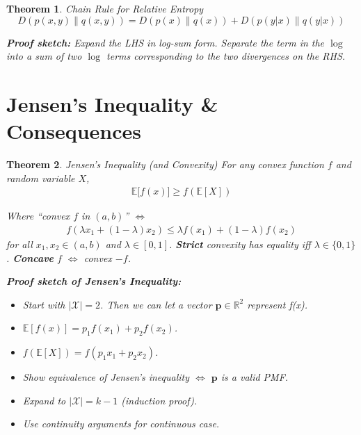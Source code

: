 \documentclass[a4paper,12pt]{report}
\newtheorem{theorem}{Theorem}
\begin{document}
\begin{theorem}{Chain Rule for Relative Entropy}
\begin{equation}
D(p(x,y) \| q(x,y)) = D(p(x) \| q(x)) + D(p(y | x) \| q(y|x))
\end{equation}

\textbf{Proof sketch:} Expand the LHS in log-sum form. Separate the term in the
$\log$ into a sum of two $\log$ terms corresponding to the two divergences on
the RHS. 

\end{theorem}



\section{Jensen's Inequality \& Consequences}

\begin{theorem}{Jensen's Inequality (and Convexity)}
For any convex function $f$ and random variable $X$, 
\begin{align}
	\mathbb E \big[ f(x)\big] \geq f(\mathbb E[X])
\end{align}

Where ``convex $f$ in $(a,b)$'' $\iff$ 
\begin{align}
	\label{eqn:convexity}
	f(\lambda x_1 + (1-\lambda) x_2 ) \leq \lambda f(x_1) + (1-\lambda) f(x_2)
\end{align}
for all $x_1, x_2 \in (a, b)$ and $\lambda \in [0,1]$. \textbf{Strict} convexity
has equality iff $\lambda \in \{0,1\}$. \textbf{Concave} $f$ $\iff$ convex $-f$.


\textbf{Proof sketch of Jensen's Inequality: } 
\begin{itemize}
\item Start with $|\mathcal X| = 2$. Then we can let a vector $\mathbf p\in
\mathbb R^2$ represent f(x). 
\item $\mathbb E[f(x)] = p_1 f(x_1) + p_2 f(x_2)$. 
\item $f(\mathbb E[X]) = f(p_1 x_1 + p_2 x_2)$.
\item Show equivalence of Jensen's inequality $\iff$ $\mathbf p$ is a valid PMF.
\item Expand to $|\mathcal X| = k-1$ (induction proof).
\item Use continuity arguments for continuous case.
\end{itemize}
\end{theorem}
\end{document}
